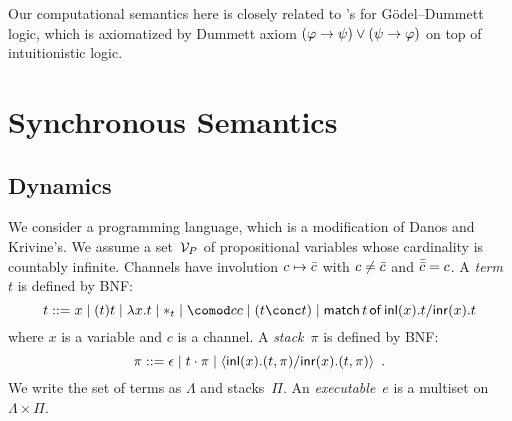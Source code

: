 Our computational semantics here is closely related to
\citet{hiraiflops2012}'s for G\"odel--Dummett logic,
which is axiomatized by Dummett axiom $(\varphi\rightarrow\psi)\lor(\psi\rightarrow\varphi)$
on top of intuitionistic logic.





\section{Synchronous Semantics}
\label{sec:sync}


\subsection{Dynamics}
We consider a programming language, which is a modification of
Danos and Krivine's.
We assume a set~$\mathcal V_P$ of propositional variables whose cardinality is
countably infinite.
Channels have involution $c\mapsto\bar{c}$ with
$c\neq \bar{c}$ and
$\bar{\bar{c}} = c$.
A \textit{term}~$t$ is defined by BNF:
\[
 t::= x
 \mid (t)t
 \mid \lambda x.t
 \mid \ast_t
 \mid \comod c c
 \mid (t\conc t)
 \mid \mat t x t x t
\]
where $x$ is a variable and $c$ is a channel.
A \textit{stack}~$\pi$ is defined by BNF:
\[
 \pi ::= \epsilon
 \mid t\cdot \pi
 \mid \langle \mathsf{inl}({x}). ({t},{\pi})/ \mathsf{inr}({x}). ({t},{\pi})\rangle
 \enspace.
\]
We write the set of terms as $\Lambda$ and stacks~$\Pi$.
An \textit{executable}~$e$ is a multiset on $\Lambda\times\Pi$.

